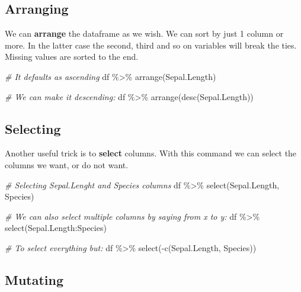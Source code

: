\documentclass[
]{book}
\newenvironment{Shaded}{\begin{snugshade}}{\end{snugshade}}
\newcommand{\CommentTok}[1]{\textcolor[rgb]{0.56,0.35,0.01}{\textit{#1}}}
\newcommand{\FunctionTok}[1]{\textcolor[rgb]{0.00,0.00,0.00}{#1}}
\newcommand{\NormalTok}[1]{#1}
\newcommand{\SpecialCharTok}[1]{\textcolor[rgb]{0.00,0.00,0.00}{#1}}
\begin{document}
\hypertarget{arranging}{%
\subsection{Arranging}\label{arranging}}

We can \textbf{arrange} the dataframe as we wish.
We can sort by just 1 column or more.
In the latter case the second, third and so on variables will break the ties.
Missing values are sorted to the end.

\begin{Shaded}
\begin{Highlighting}[]
\CommentTok{\# It defaults as ascending}
\NormalTok{df }\SpecialCharTok{\%\textgreater{}\%} 
  \FunctionTok{arrange}\NormalTok{(Sepal.Length)}

\CommentTok{\# We can make it descending:}
\NormalTok{df }\SpecialCharTok{\%\textgreater{}\%} 
  \FunctionTok{arrange}\NormalTok{(}\FunctionTok{desc}\NormalTok{(Sepal.Length))}
\end{Highlighting}
\end{Shaded}

\hypertarget{selecting}{%
\subsection{Selecting}\label{selecting}}

Another useful trick is to \textbf{select} columns.
With this command we can select the columns we want, or do not want.

\begin{Shaded}
\begin{Highlighting}[]
\CommentTok{\# Selecting Sepal.Lenght and Species columns}
\NormalTok{df }\SpecialCharTok{\%\textgreater{}\%} 
  \FunctionTok{select}\NormalTok{(Sepal.Length, Species)}

\CommentTok{\# We can also select multiple columns by saying from x to y:}
\NormalTok{df }\SpecialCharTok{\%\textgreater{}\%} 
  \FunctionTok{select}\NormalTok{(Sepal.Length}\SpecialCharTok{:}\NormalTok{Species)}

\CommentTok{\# To select everything but:}
\NormalTok{df }\SpecialCharTok{\%\textgreater{}\%} 
  \FunctionTok{select}\NormalTok{(}\SpecialCharTok{{-}}\FunctionTok{c}\NormalTok{(Sepal.Length, Species))}
\end{Highlighting}
\end{Shaded}

\hypertarget{mutating}{%
\subsection{Mutating}\label{mutating}}
\end{document}
